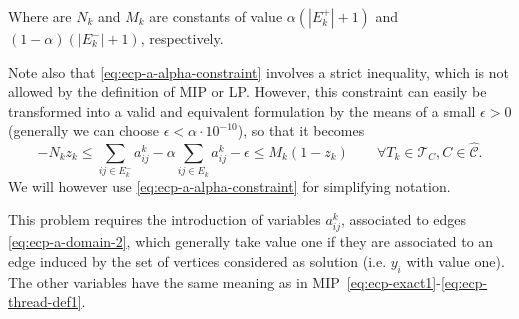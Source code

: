 Where are $N_k$ and $M_k$ are constants of value $\alpha (|E_k^{+}| + 1)$ and $(1 -
	\alpha ) (|E^{-}_k| + 1)$, respectively.

Note also that \eqref{eq:ecp-a-alpha-constraint} involves a strict inequality,
which is not allowed by the definition of
\acrshort{MIP} or \acrshort{LP}. However, this constraint can easily be
transformed into a valid
and equivalent formulation by the means of a small $\epsilon > 0$ (generally
we can choose $\epsilon < \alpha \cdot 10^{-10}$), so that
it becomes
\begin{equation*}
	-N_k z_k \leq \sum^{}_{ij \in E^-_k} a_{ij}^{k}  - \alpha \sum^{}_{ij
		\in E_k}
	a_{ij} ^{k} - \epsilon \leq M_{k} (1 - z_{k})  \quad\quad \forall T_{k} \in
	\mathcal{T} _{C}, C \in \mathcal{\hat{C}}.
\end{equation*}
We will however use \eqref{eq:ecp-a-alpha-constraint} for simplifying notation.

This problem requires the introduction of variables $a_{ij}^{k}$,
associated to edges \eqref{eq:ecp-a-domain-2}, which
generally take value one if they are associated to an edge induced by the
set of vertices considered as solution (i.e. $y_i$ with value one). The
other variables have the same meaning as in MIP~\eqref{eq:ecp-exact1}-\eqref{eq:ecp-thread-def1}.

